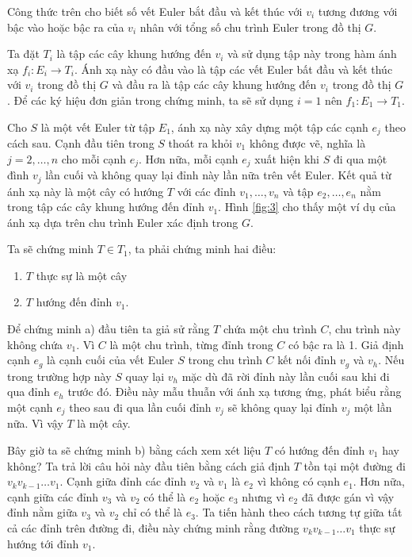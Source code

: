 \documentclass[14pt, a4paper]{article}
\numberwithin{equation}{section}
\numberwithin{figure}{section}
\numberwithin{dl}{section}
\numberwithin{md}{section}
\numberwithin{bd}{section}
\numberwithin{dn}{section}
\numberwithin{hq}{section}
\begin{document}
    Công thức trên cho biết số vết Euler bắt đầu và kết thúc với $v_i$ tương đương với bậc vào hoặc bậc ra của $v_i$ nhân với tổng số chu trình Euler trong đồ thị $G$.

    Ta đặt $T_i$ là tập các cây khung hướng đến $v_i$ và sử dụng tập này trong hàm ánh xạ $f_i: E_i \rightarrow T_i$.
    Ánh xạ này có đầu vào là tập các vết Euler bất đầu và kết thúc với $v_i$ trong đồ thị $G$ và đầu ra là tập các cây khung hướng đến $v_i$ trong đồ thị $G$.
    Để các ký hiệu đơn giản trong chứng minh, ta sẽ sử dụng $i=1$ nên $f_1: E_1 \rightarrow T_1$.

    Cho $S$ là một vết Euler từ tập $E_1$, ánh xạ này xây dựng một tập các cạnh $e_j$ theo cách sau.
    Cạnh đầu tiên trong $S$ thoát ra khỏi $v_1$ không được vẽ, nghĩa là $j=2,\dots, n$ cho mỗi cạnh $e_j$.
    Hơn nữa, mỗi cạnh $e_j$ xuất hiện khi $S$ đi qua một đình $v_j$ lần cuối và không quay lại đỉnh này lần nữa trên vết Euler.
    Kết quả từ ánh xạ này là một cây có hướng $T$ với các đỉnh $v_1, \dots, v_n$ và tập $e_2, \dots, e_n$ nằm trong tập các cây khung hướng đến đỉnh $v_1$.
    Hình \ref{fig:3} cho thấy một ví dụ của ánh xạ dựa trên chu trình Euler xác định trong $G$.

    Ta sẽ chứng minh $T \in T_1$, ta phải chứng minh hai điều:

    \begin{enumerate}[label=(\alph*)]
        \item $T$ thực sự là một cây
        \item $T$ hướng đến đỉnh $v_1$.
    \end{enumerate}

    Để chứng minh a) đầu tiên ta giả sử rằng $T$ chứa một chu trình $C$, chu trình này không chứa $v_1$.
    Vì $C$ là một chu trình, từng đỉnh trong $C$ có bậc ra là 1.
    Giả định cạnh $e_g$ là cạnh cuối của vết Euler $S$ trong chu trình $C$ kết nối đỉnh $v_g$ và $v_h$.
    Nếu trong trường hợp này $S$ quay lại $v_h$ mặc dù đã rời đỉnh này lần cuối sau khi đi qua đỉnh $e_h$ trước đó.
    Điều này mẫu thuẫn với ánh xạ tương ứng, phát biểu rằng một cạnh $e_j$ theo sau đi qua lần cuối đỉnh $v_j$ sẽ không quay lại đỉnh $v_j$ một lần nữa.
    Vì vậy $T$ là một cây.

    Bây giờ ta sẽ chứng minh b) bằng cách xem xét liệu $T$ có hướng đến đỉnh $v_1$ hay không?
    Ta trả lời câu hỏi này đầu tiên bằng cách giả định $T$ tồn tại một đường đi $v_k v_{k-1} \dots v_1$.
    Cạnh giữa đỉnh các đỉnh $v_2$ và $v_1$ là $e_2$ vì không có cạnh $e_1$.
    Hơn nữa, cạnh giữa các đỉnh $v_3$ và $v_2$ có thể là $e_2$ hoặc $e_3$ nhưng vì $e_2$ đã được gán vì vậy đỉnh nằm giữa $v_3$ và $v_2$ chỉ có thể là $e_3$.
    Ta tiến hành theo cách tương tự giữa tất cả các đỉnh trên đường đi, điều này chứng minh rằng đường $v_k v_{k-1} \dots v_1$ thực sự hướng tới đỉnh $v_1$.
\end{document}
